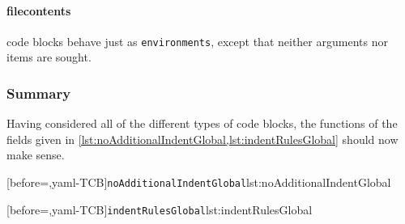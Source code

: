  \paragraph{filecontents} code blocks behave just as \texttt{environments}, except that
  neither arguments nor items are sought.

\subsubsection{Summary}
 Having considered all of the different types of code blocks, the functions of the fields
 given in \cref{lst:noAdditionalIndentGlobal,lst:indentRulesGlobal} should now make sense.

 \begin{widepage}
  \begin{minipage}{.47\linewidth}
   [before=\centering,yaml-TCB]{\texttt{noAdditionalIndentGlobal}}{lst:noAdditionalIndentGlobal}
  \end{minipage}%
  \hfill
  \begin{minipage}{.47\linewidth}
   [before=\centering,yaml-TCB]{\texttt{indentRulesGlobal}}{lst:indentRulesGlobal}
  \end{minipage}%
 \end{widepage}
